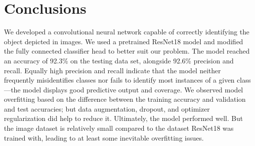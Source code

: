 \documentclass[10pt]{article}
\begin{document}
\section{Conclusions}

\indent We developed a convolutional neural network capable of correctly identifying the object depicted in images. We used a pretrained ResNet18 model and modified the fully connected classifier head to better suit our problem. The model reached an accuracy of 92.3\% on the testing data set, alongside 92.6\% precision and recall. Equally high precision and recall indicate that the model neither frequently misidentifies classes nor fails to identify most instances of a given class—the model displays good predictive output and coverage. We observed model overfitting based on the difference between the training accuracy and validation and test accuracies; but data augmentation, dropout, and optimizer regularization did help to reduce it. Ultimately, the model performed well. But the image dataset is relatively small compared to the dataset ResNet18 was trained with, leading to at least some inevitable overfitting issues.





\end{document}
